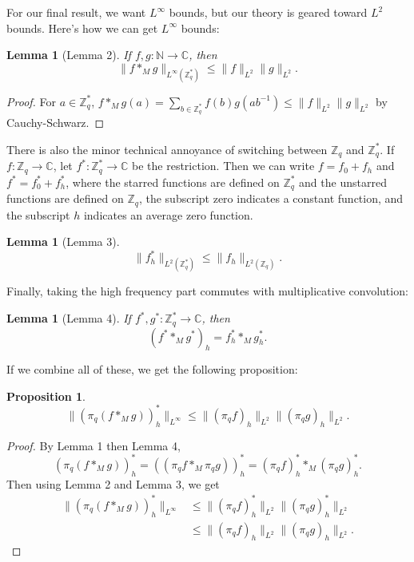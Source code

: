 \documentclass[12pt]{amsart}
\newtheorem{lemma}[theorem]{Lemma}
\newtheorem{prop}[theorem]{Proposition}
\begin{document}
For our final result, we want $L^\infty$ bounds, but our theory is geared toward $L^2$ bounds. Here's how we can get $L^\infty$ bounds:
\begin{lemma}[Lemma 2]
    If $f, g : \mathbb{N} \to \mathbb{C}$, then
    \[
        \lVert f *_M g \rVert_{L^\infty(\mathbb{Z}_q^*)} \le \lVert f \rVert_{L^2} \lVert g \rVert_{L^2}.
    \]
\end{lemma}
\begin{proof}
    For $a \in \mathbb{Z}_q^*$, $f *_M g(a) = \sum_{b \in \mathbb{Z}_q^*} f(b) g(ab^{-1}) \leq \lVert f \rVert_{L^2} \rVert g \rVert_{L^2}$ by Cauchy-Schwarz.
\end{proof}
There is also the minor technical annoyance of switching between $\mathbb{Z}_q$ and $\mathbb{Z}_q^*$. If $f : \mathbb{Z}_q \to \mathbb{C}$, let $f^* : \mathbb{Z}_q^* \to \mathbb{C}$ be the restriction. Then we can write $f = f_0 + f_h$ and $f^* = f_0^* + f_h^*$, where the starred functions are defined on $\mathbb{Z}_q^*$ and the unstarred functions are defined on $\mathbb{Z}_q$, the subscript zero indicates a constant function, and the subscript $h$ indicates an average zero function.
\begin{lemma}[Lemma 3]
    \[
        \lVert f_h^* \rVert_{L^2(\mathbb{Z}_q^*)} \leq \lVert f_h \rVert_{L^2(\mathbb{Z}_q)}.
    \]
\end{lemma}
Finally, taking the high frequency part commutes with multiplicative convolution:
\begin{lemma}[Lemma 4]
    If $f^*, g^* : \mathbb{Z}_q^* \to \mathbb{C}$, then
    \[
        (f^* *_M g^*)_h = f^*_h *_M g_h^*.
    \]
\end{lemma}
If we combine all of these, we get the following proposition:
\begin{prop}
    \[
        \lVert (\pi_q(f*_M g))^*_h \rVert_{L^\infty} \leq \lVert (\pi_q f)_h \rVert_{L^2} \lVert (\pi_q g)_h \rVert_{L^2}.
    \]
\end{prop}
\begin{proof}
    By Lemma 1 then Lemma 4,
    \[
        (\pi_q(f *_M g))^*_h = ((\pi_q f *_M \pi_q g))^*_h = (\pi_q f)^*_h *_M (\pi_q g)^*_h.
    \]
    Then using Lemma 2 and Lemma 3, we get
    \begin{align*}
        \lVert (\pi_q(f *_M g))_h^* \rVert_{L^\infty} & \leq \lVert (\pi_q f)^*_h \rVert_{L^2} \lVert (\pi_q g)^*_h \rVert_{L^2} \\
        & \leq \lVert (\pi_q f)_h \rVert_{L^2} \lVert (\pi_q g)_h \rVert_{L^2}.
    \end{align*}
\end{proof}
\end{document}
